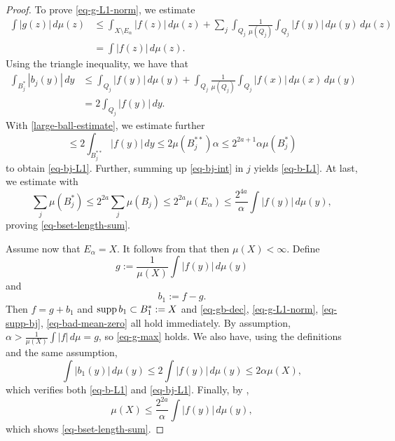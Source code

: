 \begin{proof}
To prove \eqref{eq-g-L1-norm}, we estimate
\begin{align*}
    \int |g(z)|\, d\mu(z) &\le \int_{X\setminus E_\alpha} |f(z)|\, d\mu(z) + \sum_{j} \int_{Q_j}\frac{1}{\mu(Q_j)}\int_{Q_j}|f(y)|\, d\mu(y)\,d\mu(z) \\
    &= \int |f(z)|\,d\mu(z).
\end{align*}
Using the triangle inequality, we have that
\begin{align}
    \label{eq-bj-int}
    \int_{B_j^*} |b_j(y)|\, dy &\le \int_{Q_j} |f(y)|\, d\mu(y) + \int_{Q_j} \frac{1}{\mu(Q_j)}\int_{Q_j} |f(x)|\, d\mu(x)\, d\mu(y) \\
    &= 2 \int_{Q_j} |f(y)|\, dy.
\end{align}
With \eqref{large-ball-estimate}, we estimate further
\begin{equation}
    \le 2 \int_{B_j^{**}} |f(y)|\, dy \le 2\mu(B_j^{**})\alpha \le 2^{2a+1} \alpha \mu(B_j^*)
\end{equation}
to obtain \eqref{eq-bj-L1}.
Further, summing up \eqref{eq-bj-int} in $j$ yields \eqref{eq-b-L1}.
At last, we estimate with 
\begin{equation}
    \sum_j \mu(B_j^*) \le 2^{2a} \sum_j \mu(B_j) \le 2^{2a} \mu(E_\alpha) \le \frac{2^{4a}}{\alpha}\int |f(y)|\, d\mu(y),
\end{equation}
proving \eqref{eq-bset-length-sum}.

Assume now that $E_\alpha = X$. It follows from  that then $\mu(X)<\infty$.
Define
\begin{equation*}
    g := \frac{1}{\mu(X)} \int |f(y)|\,d\mu(y)
\end{equation*}
and
\begin{equation*}
    b_1 := f - g.
\end{equation*}
Then $f = g + b_1$ and $\operatorname{\operatorname{supp}} b_1 \subset B_1^*:=X$ and \eqref{eq-gb-dec}, \eqref{eq-g-L1-norm}, \eqref{eq-supp-bj}, \eqref{eq-bad-mean-zero} all hold immediately. By assumption, $\alpha>\frac{1}{\mu(X)}\int |f|\,d\mu = g$, so \eqref{eq-g-max} holds.
We also have, using the definitions and the same assumption,
\begin{equation}
    \int |b_1(y)|\, d\mu(y) \le 2 \int |f(y)|\,d\mu(y) \le 2\alpha\mu(X),
\end{equation}
which verifies both \eqref{eq-b-L1} and \eqref{eq-bj-L1}.
Finally, by ,
\begin{equation*}
    \mu(X) \le \frac{2^{2a}}{\alpha} \int |f(y)|\,d\mu(y),
\end{equation*}
which shows \eqref{eq-bset-length-sum}.
\end{proof}

